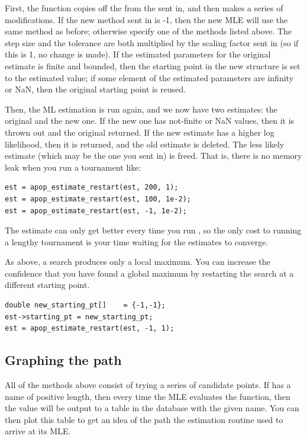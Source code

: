 First, the function copies off the 
from the  sent in, and then makes a series of
modifications.  If the new method sent in is -1, then the new MLE will
use the same method as before; otherwise specify one of the methods
listed above. The step size and the tolerance are both multiplied by the
scaling factor sent in (so if this is 1, no change is made). If the
estimated parameters for the original estimate is finite and bounded, then 
the starting point in the new 
structure is set to the estimated value; if some element of the
estimated parameters are infinity or NaN, then the original starting
point is reused.

Then, the ML estimation is run again, and we now have two estimates: the
original and the new one. If the new one has not-finite or NaN values,
then it is thrown out and the original returned. If the new estimate 
has a higher log likelihood, then it is returned, and the old estimate
is deleted.  The less likely estimate (which may be the one you sent in) is freed. That is,
there is no memory leak when you run a tournament like:
\begin{lstlisting}
est = apop_estimate_restart(est, 200, 1);
est = apop_estimate_restart(est, 100, 1e-2);
est = apop_estimate_restart(est, -1, 1e-2);
\end{lstlisting}
The estimate can only get better every time you run
, so the only cost to running a lengthy
tournament is your time waiting for the estimates to converge.

As above, a search produces only a local maximum. You can increase the
confidence that you have found a global maximum by restarting the search
at a different starting point. 
\begin{lstlisting}
double new_starting_pt[]    = {-1,-1};
est->starting_pt = new_starting_pt;
est = apop_estimate_restart(est, -1, 1);
\end{lstlisting}

\subsection{Graphing the path} All of the methods above consist of
trying a series of candidate points. 
If 
has a name of positive
length, then every time the MLE evaluates the function, then the value
will be output to a table in the database with the given name. You can
then plot this table to get an idea of the path the estimation routine
used to arrive at its MLE.

